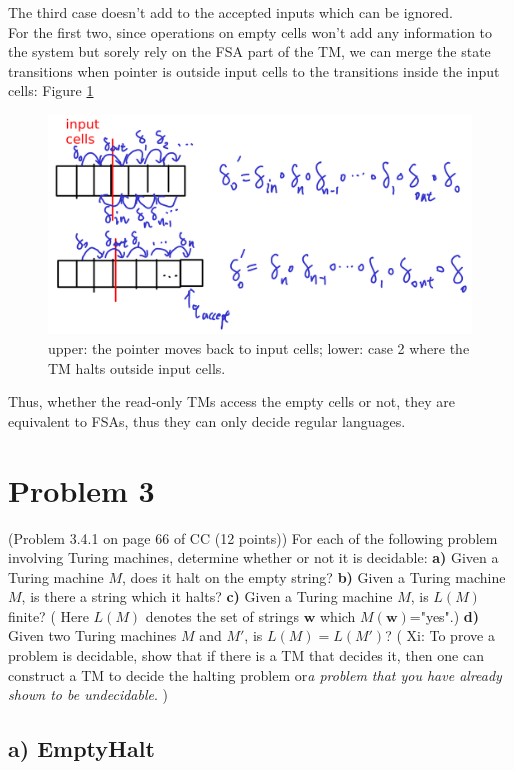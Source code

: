 \documentclass[twoside,11pt]{homework}
\begin{document}
\begin{solution}
  The third case doesn't add to the accepted inputs which can be ignored.\\
  For the first two, since operations on empty cells won't add any information to
  the system but sorely rely on the FSA part of the TM, we can merge the state
  transitions when pointer is outside input cells to the transitions inside the
  input cells: Figure \ref{fig:02}
  \begin{figure}[h]
  	\centering
  	\includegraphics[width=0.7\linewidth]{img/02.png}
  	\caption{upper: the pointer moves back to input cells; lower: case 2 where
      the TM halts outside input cells.}
  	\label{fig:02}
  \end{figure}

  Thus, whether the read-only TMs access the empty cells or not, they are
  equivalent to FSAs, thus they can only decide regular languages.

\end{solution}

\section*{Problem 3}

(Problem 3.4.1 on page 66 of CC (12 points))
For each of the following problem involving Turing machines, determine whether
or not it is decidable:
\textbf{a)} Given a Turing machine $M$, does it halt on the empty string?
\textbf{b)} Given a Turing machine $M$, is there a string which it halts?
\textbf{c)} Given a Turing machine $M$, is $L(M)$ finite?
( Here $L(M)$ denotes the set of strings $\mathbf{w}$ which $M(\mathbf{w})$="yes".)
\textbf{d)} Given two Turing machines $M$ and $M'$, is $L(M) = L(M')$?
( Xi: To prove a problem is decidable, show that if there is a TM that decides
it, then one can construct a TM to decide the halting problem or\textit{a
  problem that you have already shown to be undecidable}. )

\subsection*{a) EmptyHalt}
\end{document}
